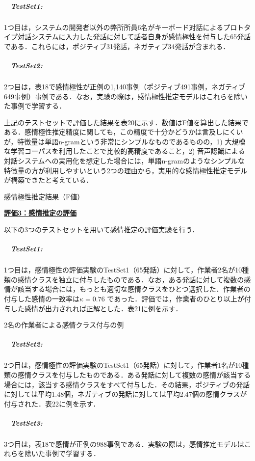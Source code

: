 \documentclass[japanese]{jnlp_1.4}
\begin{document}
\subparagraph{　TestSet1: }1つ目は，システムの開発者以外の弊所所員6名がキーボード対話によるプロトタイプ対話システムに入力した発話に対して話者自身が感情極性を付与した65発話である．これらには，ポジティブ31発話，ネガティブ34発話が含まれる．


\subparagraph{　TestSet2: }2つ目は，表18で感情極性が正例の1,140事例（ポジティブ491事例，ネガティブ649事例）事例である．なお，実験の際は，感情極性推定モデルはこれらを除いた事例で学習する．


上記のテストセットで評価した結果を表20に示す．数値はF値を算出した結果である．感情極性推定精度に関しても，この精度で十分かどうかは言及しにくいが，特徴量は単語n-gramという非常にシンプルなものであるものの，1) 大規模な学習コーパスを利用したことで比較的高精度であること，2) 音声認識による対話システムへの実用化を想定した場合には，単語n-gramのようなシンプルな特徴量の方が利用しやすいという2つの理由から，実用的な感情極性推定モデルが構築できたと考えている．

\begin{table}[b]
\vspace{-0.5\Cvs}
\caption{感情極性推定結果（F値）}
\label{table:20}

\end{table}


\noindent\textbf{\underline{評価3：感情推定の評価}}

以下の3つのテストセットを用いて感情推定の評価実験を行う．


\subparagraph{　TestSet1: }1つ目は，感情極性の評価実験のTestSet1（65発話）に対して，作業者2名が10種類の感情クラスを独立に付与したものである．なお，ある発話に対して複数の感情が該当する場合には，もっとも適切な感情クラスをひとつ選択した．作業者の付与した感情の一致率は$\kappa = 0.76$ であった．評価では，作業者のひとり以上が付与した感情が出力されれば正解とした．表21に例を示す．

\begin{table}[b]
\caption{2名の作業者による感情クラス付与の例}
\label{table:21}

\end{table}


\subparagraph{　TestSet2: }2つ目は，感情極性の評価実験のTestSet1（65発話）に対して，作業者1名が10種類の感情クラスを付与したものである．ある発話に対して複数の感情が該当する場合には，該当する感情クラスをすべて付与した．その結果，ポジティブの発話に対しては平均1.48個，ネガティブの発話に対しては平均2.47個の感情クラスが付与された．表22に例を示す．


\subparagraph{　TestSet3: }3つ目は，表18で感情が正例の988事例である．実験の際は，感情推定モデルはこれらを除いた事例で学習する．
\end{document}
